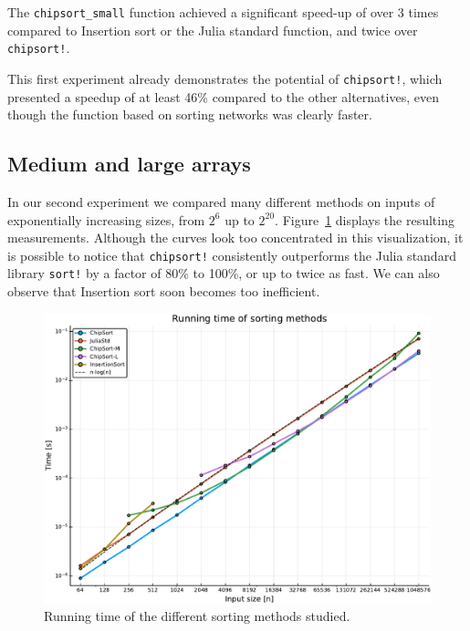 \documentclass{juliacon}
\begin{document}
The {\tt chipsort\_small} function achieved a significant speed-up of over 3 times compared to Insertion sort or the Julia standard function, and twice over {\tt chipsort!}.

\begin{table}[h]
\label{tab:bench-small}
\end{table}

This first experiment already demonstrates the potential of {\tt chipsort!}, which presented a speedup of at least 46\% compared to the other alternatives, even though the function based on sorting networks was clearly faster.

\subsection{Medium and large arrays}
In our second experiment we compared many different methods on inputs of exponentially increasing sizes, from $2^6$ up to $2^{20}$. Figure~\ref{fig:bench-time} displays the resulting measurements. Although the curves look too concentrated in this visualization, it is possible to notice that {\tt chipsort!} consistently outperforms the Julia standard library {\tt sort!} by a factor of 80\% to 100\%, or up to twice as fast. We can also observe that Insertion sort soon becomes too inefficient.

\begin{figure}[htb]
\centerline{\includegraphics[width=0.99\linewidth]{fig/chipsort-bench-time.pdf}}
\caption{Running time of the different sorting methods studied.}
\label{fig:bench-time}
\end{figure}
\end{document}
